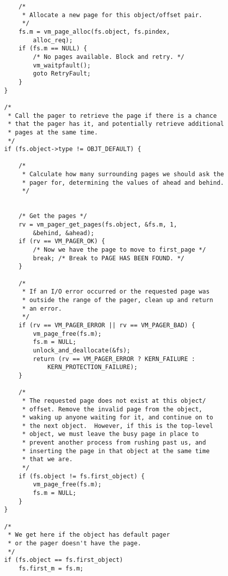 \documentclass[shortabstract, english]{iithesis}
\newenvironment{code}{}{}
\begin{document}
\begin{code}
\begin{verbatim}
            /*
             * Allocate a new page for this object/offset pair.
             */
            fs.m = vm_page_alloc(fs.object, fs.pindex,
                alloc_req);
            if (fs.m == NULL) {
                /* No pages available. Block and retry. */
                vm_waitpfault();
                goto RetryFault;
            }
        }

        /*
         * Call the pager to retrieve the page if there is a chance
         * that the pager has it, and potentially retrieve additional
         * pages at the same time.
         */
        if (fs.object->type != OBJT_DEFAULT) {

            /*
             * Calculate how many surrounding pages we should ask the
             * pager for, determining the values of ahead and behind.
             */


            /* Get the pages */
            rv = vm_pager_get_pages(fs.object, &fs.m, 1,
                &behind, &ahead);
            if (rv == VM_PAGER_OK) {
                /* Now we have the page to move to first_page */
                break; /* Break to PAGE HAS BEEN FOUND. */
            }

            /*
             * If an I/O error occurred or the requested page was
             * outside the range of the pager, clean up and return
             * an error.
             */
            if (rv == VM_PAGER_ERROR || rv == VM_PAGER_BAD) {
                vm_page_free(fs.m);
                fs.m = NULL;
                unlock_and_deallocate(&fs);
                return (rv == VM_PAGER_ERROR ? KERN_FAILURE :
                    KERN_PROTECTION_FAILURE);
            }

            /*
             * The requested page does not exist at this object/
             * offset. Remove the invalid page from the object,
             * waking up anyone waiting for it, and continue on to
             * the next object.  However, if this is the top-level
             * object, we must leave the busy page in place to
             * prevent another process from rushing past us, and
             * inserting the page in that object at the same time
             * that we are.
             */
            if (fs.object != fs.first_object) {
                vm_page_free(fs.m);
                fs.m = NULL;
            }
        }

        /*
         * We get here if the object has default pager
         * or the pager doesn't have the page.
         */
        if (fs.object == fs.first_object)
            fs.first_m = fs.m;


\end{verbatim}
\end{code}
\end{document}
